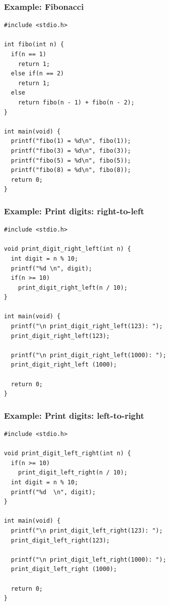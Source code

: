 \documentclass{../c-lecture}
\begin{document}
\begin{frame}[fragile]
  \frametitle{Example: Fibonacci}
  \begin{verbatim}
#include <stdio.h>

int fibo(int n) {
  if(n == 1)
    return 1;
  else if(n == 2)
    return 1;
  else
    return fibo(n - 1) + fibo(n - 2);
}

int main(void) {
  printf("fibo(1) = %d\n", fibo(1));
  printf("fibo(3) = %d\n", fibo(3));
  printf("fibo(5) = %d\n", fibo(5));
  printf("fibo(8) = %d\n", fibo(8));
  return 0;
}
  \end{verbatim}
\end{frame}

\begin{frame}[fragile]
  \frametitle{Example: Print digits: right-to-left}
  \begin{verbatim}
#include <stdio.h>

void print_digit_right_left(int n) {
  int digit = n % 10;
  printf("%d \n", digit);
  if(n >= 10)
    print_digit_right_left(n / 10);
}

int main(void) {
  printf("\n print_digit_right_left(123): ");
  print_digit_right_left(123);

  printf("\n print_digit_right_left(1000): ");
  print_digit_right_left (1000);

  return 0;
}
  \end{verbatim}
\end{frame}

\begin{frame}[fragile]
  \frametitle{Example: Print digits: left-to-right}
  \begin{verbatim}
#include <stdio.h>

void print_digit_left_right(int n) {
  if(n >= 10)
    print_digit_left_right(n / 10);
  int digit = n % 10;
  printf("%d  \n", digit);
}

int main(void) {
  printf("\n print_digit_left_right(123): ");
  print_digit_left_right(123);

  printf("\n print_digit_left_right(1000): ");
  print_digit_left_right (1000);

  return 0;
}
  \end{verbatim}
\end{frame}
\end{document}
